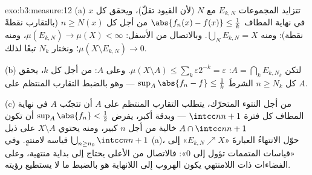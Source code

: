 \begin{solution}{exo:b3:measure:12}
(a) تتزايد المجموعات $E_{k,N}$ مع $N$ (لأن القيود تقلّ)، ويحقق
كل $x$ في نهاية المطاف $\abs{f_n(x)
- f(x)} \leq \frac1k$ من أجل كل $n \geq N(x)$ (بالتقارب
نقطةً نقطة): ومنه $\bigcup_NE_{k,N} = X$. وبالاتصال من الأسفل: $\mu(E_{k,N}) \to \mu(X) < \infty$، ومنه
$\mu(X\setminus
E_{k,N}) \to 0$؛ ونختار $N_k$ تبعًا لذلك.

(b) لتكن $A = \bigcap_kE_{k,N_k}$: $\mu(X\setminus A) \leq
\sum_k\varepsilon2^{-k} = \varepsilon$. وعلى $A$: من أجل كل $k$، يحقق كل
$n \geq N_k$ الشرطَ $\sup_A\abs{f_n - f} \leq
\frac1k$ --- وهو بالضبط التقارب المنتظم على
$A$.

(c) من أجل النتوء المتحرّك، يتطلب التقارب المنتظم على $A$ أن
تتجنّب $A$ في نهاية المطاف كل فترة $\intcc n{n+1}$ --- وبدقة
أكبر، يفرض $\sup_A\abs{f_n} < \frac12$ أن تكون $A \cap \intcc
n{n+1}$ خالية من أجل $n$ كبير، ومنه
يحتوي $X \setminus A$ على ذيل $\bigcup_{n\geq n_0}\intcc n{n+1}$ قياسه لامنتهٍ. وفي (a)،
حوّل الانتهاءُ العبارةَ «$E_{k,N}\nearrow X$» إلى «قياسات المتممات تؤول إلى
$0$»: فالاتصال من الأعلى يحتاج إلى بداية منتهية، وعلى الفضاءات
ذات  اللامنتهي يكون الهروب إلى اللانهاية هو بالضبط ما لا
يستطيع رؤيته.
\end{solution}

